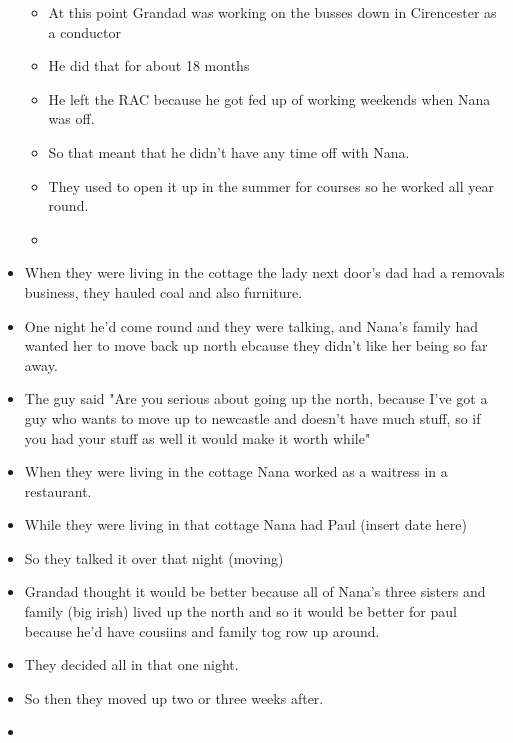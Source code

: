 \documentclass[10pt,twocolumn,letterpaper]{article}
\begin{document}
\begin{itemize}
\begin{itemize}
        \item At this point Grandad was working on the busses down in Cirencester as a conductor
        \item He did that for about 18 months
        \item He left the RAC because he got fed up of working weekends when Nana was off. 
        \item So that meant that he didn't have any time off with Nana.
        \item They used to open it up in the summer for courses so he worked all year round.
        \item 
    \end{itemize}
    \item When they were living in the cottage the lady next door's dad had a removals business, they hauled coal and also furniture.
    \item One night he'd come round and they were talking, and Nana's family had wanted her to move back up north ebcause they didn't like her being so far away.
    \item The guy said "Are you serious about going up the north, because I've got a guy who wants to move up to newcastle and doesn't have much stuff, so if you had your stuff as well it would make it worth while"
    \item When they were living in the cottage Nana worked as a waitress in a restaurant. 
    \item While they were living in that cottage Nana had Paul (insert date here)
    \item So they talked it over that night (moving)
    \item Grandad thought it would be better because all of Nana's three sisters and family (big irish) lived up the north and so it would be  better for paul because he'd have cousiins and family tog row up around.
    \item They decided all in that one night.
    \item So then they moved up two or three weeks after.
    \item 


\end{itemize}
\end{document}
